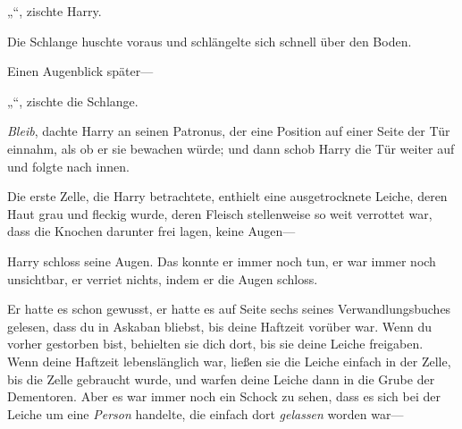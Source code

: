 „“, zischte Harry.

Die Schlange huschte voraus und schlängelte sich schnell über den Boden.

Einen Augenblick später—

„“, zischte die Schlange.

\emph{Bleib}, dachte Harry an seinen Patronus, der eine Position auf einer Seite der Tür einnahm, als ob er sie bewachen würde; und dann schob Harry die Tür weiter auf und folgte nach innen.

Die erste Zelle, die Harry betrachtete, enthielt eine ausgetrocknete Leiche, deren Haut grau und fleckig wurde, deren Fleisch stellenweise so weit verrottet war, dass die Knochen darunter frei lagen, keine Augen—

Harry schloss seine Augen. Das konnte er immer noch tun, er war immer noch unsichtbar, er verriet nichts, indem er die Augen schloss.

Er hatte es schon gewusst, er hatte es auf Seite sechs seines Verwandlungsbuches gelesen, dass du in Askaban bliebst, bis deine Haftzeit vorüber war. Wenn du vorher gestorben bist, behielten sie dich dort, bis sie deine Leiche freigaben. Wenn deine Haftzeit lebenslänglich war, ließen sie die Leiche einfach in der Zelle, bis die Zelle gebraucht wurde, und warfen deine Leiche dann in die Grube der Dementoren. Aber es war immer noch ein Schock zu sehen, dass es sich bei der Leiche um eine \emph{Person} handelte, die einfach dort \emph{gelassen} worden war—

